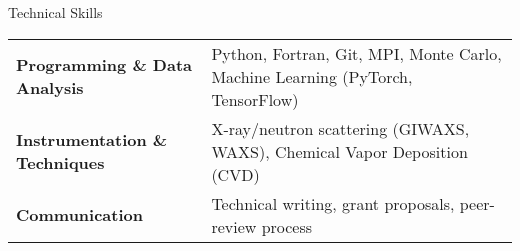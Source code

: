 
\begin{rubric}{Technical Skills}
\begin{tabular}{@{}ll@{}}
\textbf{Programming \& Data Analysis} & Python, Fortran, Git, MPI, Monte Carlo, Machine Learning (PyTorch, TensorFlow) \\
\textbf{Instrumentation \& Techniques} & X-ray/neutron scattering (GIWAXS, WAXS), Chemical Vapor Deposition (CVD)\\
\textbf{Communication} & Technical writing, grant proposals, peer-review process\\
\end{tabular}
\end{rubric}
